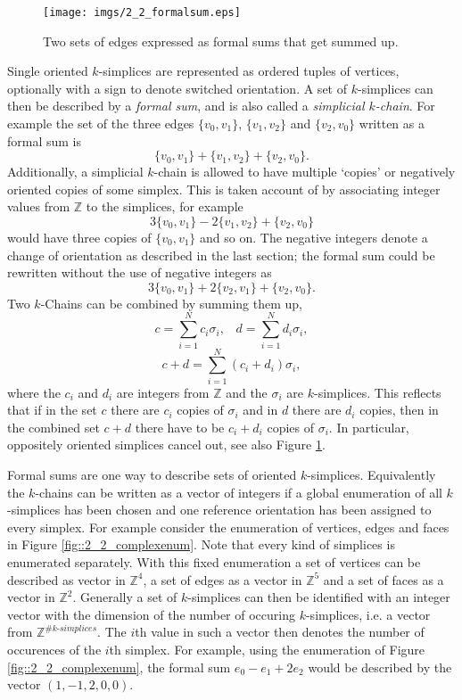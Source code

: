 \begin{figure}
\begin{center}
\texttt{[image: imgs/2\_2\_formalsum.eps]}
\end{center}
\caption{Two sets of edges expressed as formal sums that get summed up.}
\label{fig::2_2_formalsum}
\end{figure}

Single oriented $k$-simplices are represented as ordered tuples of vertices, optionally with a sign to denote switched orientation. A set of $k$-simplices can then be described by a \emph{formal sum}, and is also called a \emph{simplicial $k$-chain}. For example the set of the three edges $\{v_0, v_1\}$, $\{v_1, v_2\}$ and $\{v_2, v_0\}$ written as a formal sum is
\[\{v_0,v_1\} + \{v_1,v_2\} +\{v_2,v_0\}.\]
Additionally, a simplicial $k$-chain is allowed to have multiple `copies' or negatively oriented copies of some simplex. This is taken account of by associating integer values from $\mathbb Z$ to the simplices, for example
\[3\{v_0,v_1\} -2\{v_1,v_2\} +\{v_2,v_0\}\]
would have three copies of $\{v_0,v_1\}$ and so on. The negative integers denote a change of orientation as described in the last section; the formal sum could be rewritten without the use of negative integers as
\[3\{v_0,v_1\} +2\{v_2,v_1\} +\{v_2,v_0\}.\]
Two $k$-Chains can be combined by summing them up,
$$c = \sum_{i=1}^N c_i \sigma_i,\;\;\; d= \sum_{i=1}^N d_i \sigma_i,$$
$$c+d = \sum_{i=1}^N (c_i + d_i)\sigma_i,$$
where the $c_i$ and $d_i$ are integers from $\mathbb Z$ and the $\sigma_i$ are $k$-simplices. This reflects that if in the set $c$ there are $c_i$ copies of $\sigma_i$ and in $d$ there are $d_i$ copies, then in the combined set $c+d$ there have to be $c_i+d_i$ copies of $\sigma_i$. In particular, oppositely oriented simplices cancel out, see also Figure \ref{fig::2_2_formalsum}.

Formal sums are one way to describe sets of oriented $k$-simplices. Equivalently the $k$-chains can be written as a vector of integers if a global enumeration of all $k$-simplices has been chosen and one reference orientation has been assigned to every simplex. For example consider the enumeration of vertices, edges and faces in Figure \ref{fig::2_2_complexenum}. Note that every kind of simplices is enumerated separately. With this fixed enumeration a set of vertices can be described as vector in $\mathbb Z^4$, a set of edges as a vector in $\mathbb Z^5$ and a set of faces as a vector in $\mathbb Z^2$. Generally a set of $k$-simplices can then be identified with an integer vector with the dimension of the number of occuring $k$-simplices, i.e. a vector from $\mathbb Z^{\#k\text{-}simplices}$. The $i$th value in such a vector then denotes the number of occurences of the $i$th simplex. For example, using the enumeration of Figure \ref{fig::2_2_complexenum}, the formal sum $e_0 -e_1 + 2e_2$ would be described by the vector $(1,-1,2,0,0)$.

